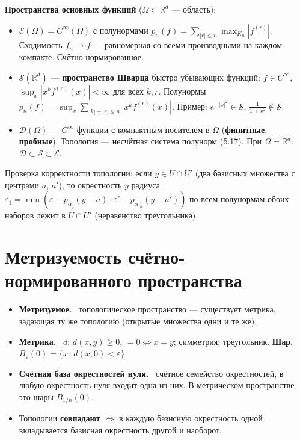 \documentclass[11pt,a4paper]{article}
\newcommand{\RR}{\mathbb R}
\newcommand{\DD}{\mathcal D}
\newcommand{\EE}{\mathcal E}
\newcommand{\Sc}{\mathcal S}
\newcommand{\df}[1]{\textbf{#1.}~}
\begin{document}
\textbf{Пространства основных функций} ($\Omega\subset\RR^d$ — область):
\begin{itemize}
\item $\EE(\Omega)=C^\infty(\Omega)$ с полунормами $p_n(f)=\sum_{|r|\le n}\max_{K_n}|f^{(r)}|$. Сходимость $f_n\to f$ — равномерная со всеми производными на каждом компакте. Счётно-нормированное.
\item $\Sc(\RR^d)$ — \textbf{пространство Шварца} быстро убывающих функций: $f\in C^\infty$, $\sup_x|x^kf^{(r)}(x)|<\infty$ для всех $k,r$. Полунормы $p_n(f)=\sup_x\sum_{|k|+|r|\le n}|x^kf^{(r)}(x)|$. Пример: $e^{-|x|^2}\in\Sc$, $\frac1{1+x^2}\notin\Sc$.
\item $\DD(\Omega)$ — $C^\infty$-функции с компактным носителем в $\Omega$ (\textbf{финитные}, \textbf{пробные}). Топология — несчётная система полунорм (б.17). При $\Omega=\RR^d$: $\DD\subset\Sc\subset\EE$.
\end{itemize}
Проверка корректности топологии: если $y\in U\cap U'$ (два базисных множества с центрами $a$, $a'$), то окрестность $y$ радиуса $\varepsilon_1=\min(\varepsilon-p_{\alpha_j}(y-a),\ \varepsilon'-p_{\alpha'_k}(y-a'))$ по всем полунормам обоих наборов лежит в $U\cap U'$ (неравенство треугольника).

\section{Метризуемость счётно-нормированного пространства}
\begin{defs}
\begin{itemize}
\item \df{Метризуемое} топологическое пространство — существует метрика, задающая ту же топологию (открытые множества одни и те же).
\item \df{Метрика} $d$: $d(x,y)\ge0$, $=0\iff x=y$; симметрия; треугольник. \df{Шар} $B_\varepsilon(0)=\{x:\ d(x,0)<\varepsilon\}$.
\item \df{Счётная база окрестностей нуля} счётное семейство окрестностей, в любую окрестность нуля входит одна из них. В метрическом пространстве это шары $B_{1/n}(0)$.
\item Топологии \textbf{совпадают} $\iff$ в каждую базисную окрестность одной вкладывается базисная окрестность другой и наоборот.
\end{itemize}
\end{defs}
\end{document}
